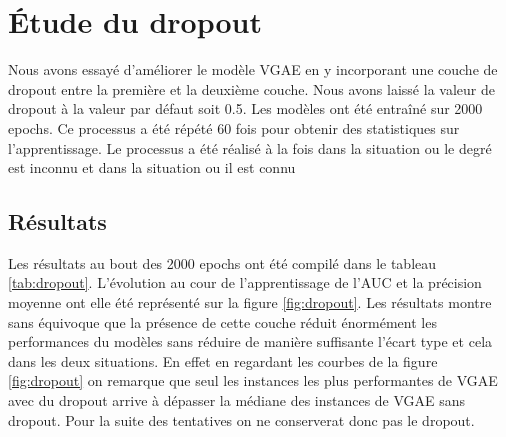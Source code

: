 \documentclass{article}
\begin{document}
\section{Étude du dropout}
Nous avons essayé d'améliorer le modèle VGAE en y incorporant une couche de dropout entre la première et la deuxième couche. 
Nous avons laissé la valeur de dropout à la valeur par défaut soit 0.5. 
Les modèles ont été entraîné sur 2000 epochs. 
Ce processus a été répété 60 fois pour obtenir des statistiques sur l'apprentissage.
Le processus a été réalisé à la fois dans la situation ou le degré est inconnu et dans la situation ou il est connu

\subsection{Résultats}
Les résultats au bout des 2000 epochs ont été compilé dans le tableau \ref{tab:dropout}.
L'évolution au cour de l'apprentissage de l'AUC et la précision moyenne ont elle été représenté sur la figure \ref{fig:dropout}.
Les résultats montre sans équivoque que la présence de cette couche réduit énormément les performances du modèles sans réduire de manière suffisante l'écart type et cela dans les deux situations.
En effet en regardant les courbes de la figure \ref{fig:dropout} on remarque que seul les instances les plus performantes de VGAE avec du dropout arrive à dépasser la médiane des instances de VGAE sans dropout.
Pour la suite des tentatives on ne conserverat donc pas le dropout.
\end{document}
